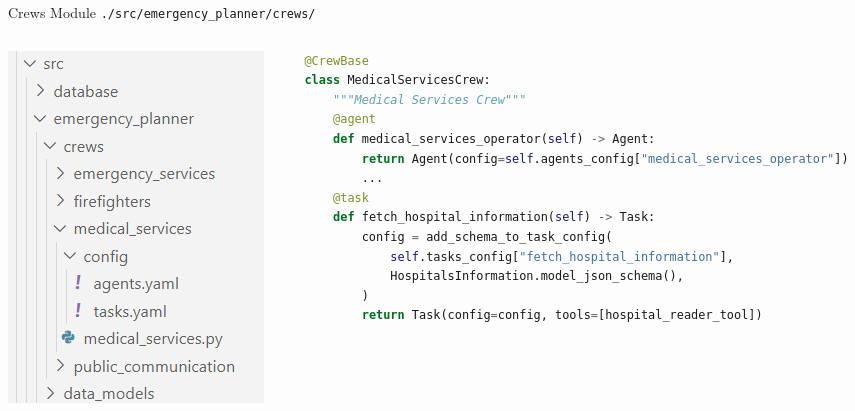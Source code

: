 \begin{frame}[fragile]{Crews Module}
    \texttt{./src/emergency\_planner/crews/}
    \begin{columns}[T]
      \begin{column}{0.3\textwidth}
          \includegraphics[width=\textwidth]{figures/crews_modules_folders.png}
      \end{column}
      \begin{column}{0.68\textwidth}
        \begin{lstlisting}[language=Python, breaklines=true]
@CrewBase
class MedicalServicesCrew:
    """Medical Services Crew"""
    @agent
    def medical_services_operator(self) -> Agent:
        return Agent(config=self.agents_config["medical_services_operator"])
        ...
    @task
    def fetch_hospital_information(self) -> Task:
        config = add_schema_to_task_config(
            self.tasks_config["fetch_hospital_information"],
            HospitalsInformation.model_json_schema(),
        )
        return Task(config=config, tools=[hospital_reader_tool])
        \end{lstlisting}
      \end{column}
    \end{columns}
\end{frame}